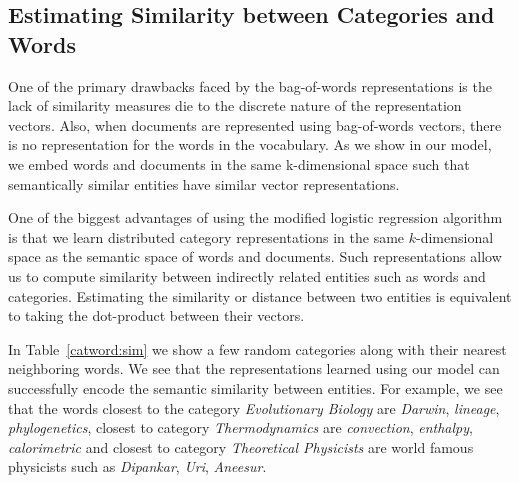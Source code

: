 
\subsection{Estimating Similarity between Categories and Words}
One of the primary drawbacks faced by the bag-of-words representations is the lack of similarity measures die to the discrete nature of the representation vectors. Also, when documents are represented using bag-of-words vectors, there is no representation for the words in the vocabulary. 
As we show in our model, we embed words and documents in the same k-dimensional space such that semantically similar entities have similar vector representations. 

One of the biggest advantages of using the modified logistic regression algorithm is that we learn distributed category representations in the same $k$-dimensional space as the semantic space of words and documents. Such representations allow us to compute similarity between indirectly related entities such as words and categories. Estimating the similarity or distance between two entities is equivalent to taking the dot-product between their vectors.

In Table~\ref{catword:sim} we show a few random categories along with their nearest neighboring words. We see that the representations learned using our model can successfully encode the semantic similarity between entities. For example, we see that the words closest to the category \emph{Evolutionary Biology} are \emph{Darwin}, \emph{lineage}, \emph{phylogenetics}, closest to category \emph{Thermodynamics} are \emph{convection}, \emph{enthalpy}, \emph{calorimetric} and closest to category \emph{Theoretical Physicists} are world famous physicists such as \emph{Dipankar}, \emph{Uri}, \emph{Aneesur}.

